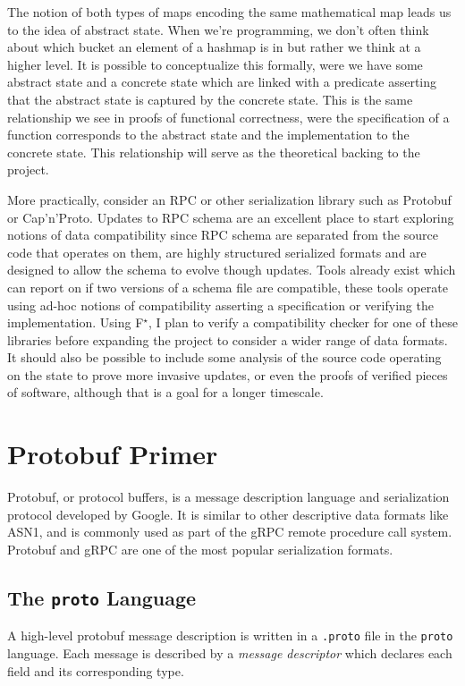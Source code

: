 \documentclass[11pt]{article}
\theoremstyle{definition}
\theoremstyle{plain}
\newcommand{\fstar}{F$^\star$}
\begin{document}
The notion of both types of maps encoding the same mathematical map leads us to
the idea of abstract state. When we're programming, we don't often think about
which bucket an element of a hashmap is in but rather we think at a higher
level. It is possible to conceptualize this formally, were we have some abstract
state and a concrete state which are linked with a predicate asserting that the
abstract state is captured by the concrete state. This is the same relationship
we see in proofs of functional correctness, were the specification of a function
corresponds to the abstract state and the implementation to the concrete
state. This relationship will serve as the theoretical backing to the project.

More practically, consider an RPC or other serialization library such as
Protobuf or Cap'n'Proto. Updates to RPC schema are an excellent place to start
exploring notions of data compatibility since RPC schema are separated from the
source code that operates on them, are highly structured serialized formats and
are designed to allow the schema to evolve though updates. Tools already exist
which can report on if two versions of a schema file are compatible, these tools
operate using ad-hoc notions of compatibility asserting a specification or
verifying the implementation. Using \fstar{}, I plan to verify a compatibility
checker for one of these libraries before expanding the project to consider a
wider range of data formats. It should also be possible to include some analysis
of the source code operating on the state to prove more invasive updates, or
even the proofs of verified pieces of software, although that is a goal for a
longer timescale.

\section{Protobuf Primer}

Protobuf, or protocol buffers, is a message description language and
serialization protocol developed by Google. It is similar to other descriptive
data formats like ASN1, and is commonly used as part of the gRPC remote
procedure call system. Protobuf and gRPC are one of the most popular
serialization formats.

\subsection{The \texttt{proto} Language}

A high-level protobuf message description is written in a \texttt{.proto} file
in the \texttt{proto} language. Each message is described by a \emph{message
	descriptor} which declares each field and its corresponding type.
\end{document}
